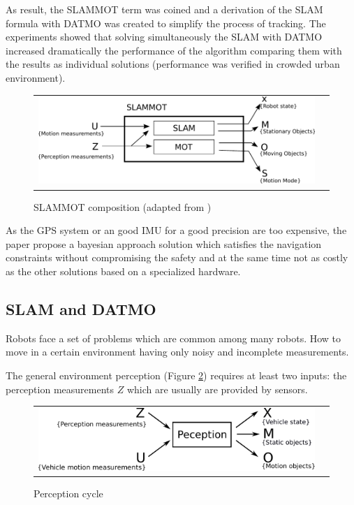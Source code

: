 As result, the SLAMMOT term was coined and a derivation of the SLAM formula with DATMO was created to simplify the process of tracking. The experiments showed that solving simultaneously the SLAM with DATMO increased dramatically the performance of the algorithm comparing them with the results as individual solutions (performance was verified in crowded urban environment).

\begin{figure}[h]
   \centering
     \begin{tabular}{lr}
       \includegraphics[scale=0.9]{img/fig:slammot}
     \end{tabular}
   \caption{SLAMMOT composition (adapted from \cite{Wang04a})}
   \label{fig:slammot}
 \end{figure}

As the GPS system or an good IMU for a good precision are too expensive, the paper propose a bayesian approach solution which satisfies the navigation constraints without compromising the safety and at the same time not as costly as the other solutions based on a specialized hardware.

\subsection{SLAM and DATMO}

Robots face a set of problems which are common among many robots. How to move in a certain environment having only noisy and incomplete measurements.

The general environment perception (Figure \ref{fig:perception:cycle}) requires at least two inputs: the perception measurements $Z$ which are usually are provided by sensors.

\begin{figure}[h]
   \centering
     \begin{tabular}{lr}
       \includegraphics[scale=0.5]{img/fig:perception:cycle}
     \end{tabular}
   \caption{Perception cycle}
   \label{fig:perception:cycle}
 \end{figure}


